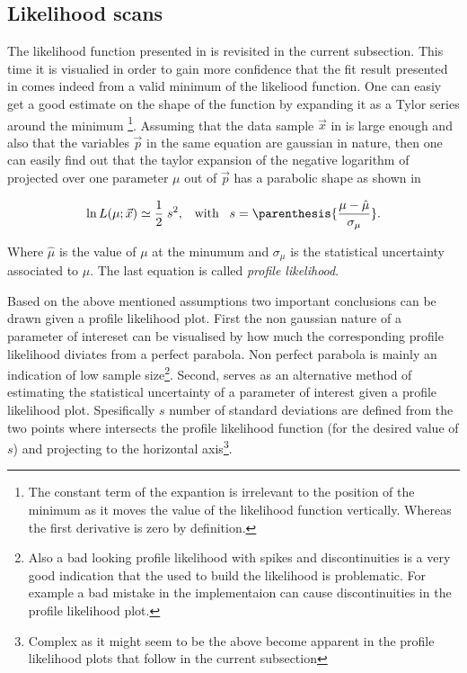 \subsection{Likelihood scans}
\label{nllscans}
\clearpage
The likelihood function presented in  is revisited in the current subsection.
This time it is visualied in order to gain more confidence that the fit result presented in 
comes indeed from a valid minimum of the likeliood function. One can easiy get a good estimate on the shape of the function
by expanding it as a Tylor series around the 
minimum \footnote{The constant term of the
expantion is irrelevant to the position of the minimum as it moves the value of the likelihood function vertically. Whereas
the first derivative is zero by definition.}. Assuming that the data sample $\vec{x}$ in  is large enough
and also that the variables $\vec{p}$ in the same equation are gaussian in nature, then one can easily find out that the 
taylor expansion of the negative logarithm of  projected over one parameter $\mu$ out of $\vec{p}$ has a
parabolic shape as shown in 
 
\begin{equation}
\ln L(\mu;\vec{x}) \simeq \frac{1}{2} \; s^2, \;\;\; \text{with} \;\;\; s = \parenthesis{\frac{\mu-\hat{\mu}}{\sigma_{\mu}}}.
\label{likelihood_exp}
\end{equation}

\noindent Where $\hat{\mu}$ is the value of $\mu$ at the minumum and $\sigma_{\mu}$ is the statistical uncertainty associated
to $\mu$. The last equation is called {\it profile likelihood}.

Based on the above mentioned assumptions two important conclusions can be drawn given a profile likelihood plot. First the non 
gaussian nature of a parameter of intereset can be visualised by how much the corresponding profile likelihood diviates from
a perfect parabola. Non perfect parabola is mainly an indication of low sample 
size\footnote{Also a bad looking profile likelihood with spikes and discontinuities is a very good indication that the \pdf
used to build the likelihood is problematic. For example a bad mistake in the implementaion can cause discontinuities in the
profile likelihood plot.}. Second,  serves as an alternative method of estimating the statistical uncertainty
of a parameter of interest given a profile likelihood plot. Spesifically $s$ number of standard deviations are defined from the two 
points where  intersects the profile likelihood function (for the desired value of $s$) and projecting to 
the horizontal 
axis\footnote{Complex as it might seem to be the above become apparent in the profile likelihood plots that follow in the current subsection}. 

